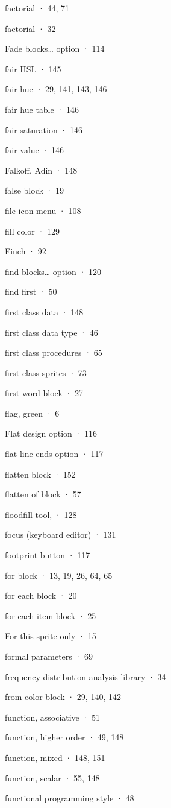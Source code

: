 factorial · 44, 71

factorial · 32

Fade blocks\ldots{} option · 114

fair HSL · 145

fair hue · 29, 141, 143, 146

fair hue table · 146

fair saturation · 146

fair value · 146

Falkoff, Adin · 148

false block · 19

file icon menu · 108

fill color · 129

Finch · 92

find blocks\ldots{} option · 120

find first · 50

first class data · 148

first class data type · 46

ﬁrst class procedures · 65

ﬁrst class sprites · 73

first word block · 27

flag, green · 6

Flat design option · 116

flat line ends option · 117

flatten block · 152

flatten of block · 57

floodfill tool, · 128

focus (keyboard editor) · 131

footprint button · 117

for block · 13, 19, 26, 64, 65

for each block · 20

for each item block · 25

For this sprite only · 15

formal parameters · 69

frequency distribution analysis library · 34

from color block · 29, 140, 142

function, associative · 51

function, higher order · 49, 148

function, mixed · 148, 151

function, scalar · 55, 148

functional programming style · 48

